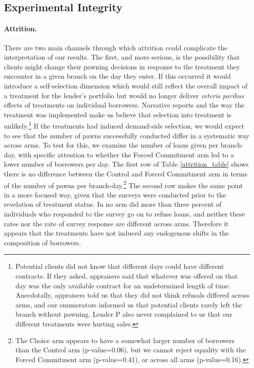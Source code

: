 \documentclass[oneside,11pt]{article}
\begin{document}
\subsection{Experimental Integrity}
\label{sec:integrity}

\paragraph{Attrition.} There are two main channels through which attrition could complicate the interpretation of our results. The first, and more serious, is the possibility that clients might change their pawning decisions in response to the treatment they encounter in a given branch on the day they enter.  If this occurred it would introduce a self-selection dimension which would still reflect the overall impact of a treatment for the lender's portfolio but would no longer deliver \textit{ceteris paribus} effects of treatments on individual borrowers.  Narrative reports and the way the treatment was implemented make us believe that selection into treatment is unlikely.\footnote{Potential clients did not know that different days could have different contracts. If they asked, appraisers said that whatever was offered on that day was the only available contract for an undetermined length of time. Anecdotally, appraisers told us that they did not think refusals differed across arms, and our enumerators informed us that potential clients rarely left the branch without pawning. Lender P also never complained to us that our different treatments were hurting sales.} If the treatments had induced demand-side selection, we would expect to see that the number of pawns successfully conducted differ in a systematic way across arms.  To test for this, we examine the number of loans given per branch-day, with specific attention to whether the Forced Commitment arm led to a lower number of borrowers per day. The first row of Table \ref{attrition_table} shows there is no difference between the Control and Forced Commitment arm in terms of the number of pawns per branch-day.\footnote{The Choice arm appears to have a somewhat larger number of borrowers than the Control arm (p-value=0.06), but we cannot reject equality with the Forced Commitment arm (p-value=0.41), or across all arms (p-value=0.16).}  The second row makes the same point in a more focused way, given that the surveys were conducted prior to the revelation of treatment status.  In no arm did more than three percent of individuals who responded to the survey go on to refuse loans, and neither these rates nor the rate of survey response are different across arms.  Therefore it appears that the treatments have not induced any endogenous shifts in the composition of borrowers.
\end{document}
